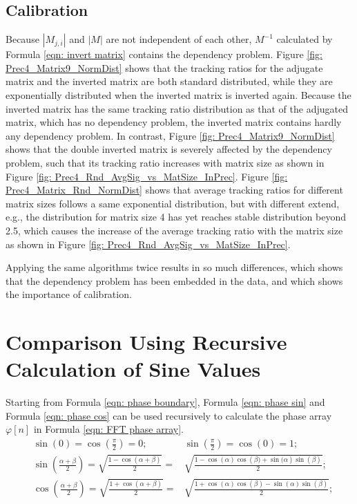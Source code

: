 \documentclass[twoside]{article}
\numberwithin{equation}{section}
\begin{document}
\subsection{Calibration}
\label{sec: calibration}

Because \textbf{$|M_{j,i}|$} and \textbf{$|M|$} are not independent of each other, \textbf{$M^{-1}$} calculated by Formula \eqref{eqn: invert matrix} contains the dependency problem. Figure \ref{fig: Prec4_Matrix9_NormDist} shows that the tracking ratios for the adjugate matrix and the inverted matrix are both standard distributed, while they are exponentially distributed when the inverted matrix is inverted again.  Because the inverted matrix has the same tracking ratio distribution as that of the adjugated matrix, which has no dependency problem, the inverted matrix contains hardly any dependency problem.  In contrast, Figure \ref{fig: Prec4_Matrix9_NormDist} shows that the double inverted matrix is severely affected by the dependency problem, such that its tracking ratio increases with matrix size as shown in Figure \ref{fig: Prec4_Rnd_AvgSig_vs_MatSize_InPrec}.  Figure \ref{fig: Prec4_Matrix_Rnd_NormDist} shows that average tracking ratios for different matrix sizes follows a same exponential distribution, but with different extend, e.g., the distribution for matrix size 4 has yet reaches stable distribution beyond 2.5, which causes the increase of the average tracking ratio with the matrix size as shown in Figure \ref{fig: Prec4_Rnd_AvgSig_vs_MatSize_InPrec}.

Applying the same algorithms twice results in so much differences, which shows that the dependency problem has been embedded in the data, and which shows the importance of calibration.



\clearpage
\section{Comparison Using Recursive Calculation of Sine Values}
\label{sec: recursion}

Starting from Formula \eqref{eqn: phase boundary}, Formula \eqref{eqn: phase sin} and Formula \eqref{eqn: phase cos} can be used recursively to calculate the phase array $\varphi[n]$ in Formula \eqref{eqn: FFT phase array}.  
\begin{align}
\label{eqn: phase boundary}
& \sin(0) = \cos(\frac{\pi}{2}) = 0; & \sin(\frac{\pi}{2}) = \cos(0) = 1; \\
\label{eqn: phase sin}
& \sin \left(\frac{\alpha + \beta}{2} \right) = \sqrt{\frac{1 - \cos \left(\alpha + \beta \right)}{2}} = & \sqrt{\frac{1 - \cos(\alpha) \cos \left(\beta) + \sin(\alpha \right) \sin(\beta)}{2}}; \\
\label{eqn: phase cos}
& \cos \left(\frac{\alpha + \beta}{2} \right) = \sqrt{\frac{1 + \cos \left(\alpha + \beta \right)}{2}} = & \sqrt{\frac{1 + \cos(\alpha) \cos(\beta) - \sin(\alpha) \sin(\beta)}{2}};
\end{align}
\end{document}
